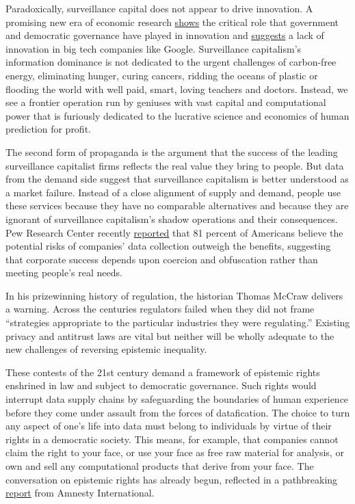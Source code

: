 Paradoxically, surveillance capital does not appear to drive innovation.
A promising new era of economic research
\href{https://www.youtube.com/watch?v=xJgjLfx-Bcs}{shows} the critical
role that government and democratic governance have played in innovation
and
\href{http://germangutierrezg.com/GutierrezPhilippon_Fading_Stars_2019.pdf}{suggests}
a lack of innovation in big tech companies like Google. Surveillance
capitalism's information dominance is not dedicated to the urgent
challenges of carbon-free energy, eliminating hunger, curing cancers,
ridding the oceans of plastic or flooding the world with well paid,
smart, loving teachers and doctors. Instead, we see a frontier operation
run by geniuses with vast capital and computational power that is
furiously dedicated to the lucrative science and economics of human
prediction for profit.

The second form of propaganda is the argument that the success of the
leading surveillance capitalist firms reflects the real value they bring
to people. But data from the demand side suggest that surveillance
capitalism is better understood as a market failure. Instead of a close
alignment of supply and demand, people use these services because they
have no comparable alternatives and because they are ignorant of
surveillance capitalism's shadow operations and their consequences. Pew
Research Center recently
\href{https://www.pewresearch.org/internet/2019/11/15/americans-and-privacy-concerned-confused-and-feeling-lack-of-control-over-their-personal-information/}{reported}
that 81 percent of Americans believe the potential risks of companies'
data collection outweigh the benefits, suggesting that corporate success
depends upon coercion and obfuscation rather than meeting people's real
needs.

In his prizewinning history of regulation, the historian Thomas McCraw
delivers a warning. Across the centuries regulators failed when they did
not frame ``strategies appropriate to the particular industries they
were regulating.'' Existing privacy and antitrust laws are vital but
neither will be wholly adequate to the new challenges of reversing
epistemic inequality.

These contests of the 21st century demand a framework of epistemic
rights enshrined in law and subject to democratic governance. Such
rights would interrupt data supply chains by safeguarding the boundaries
of human experience before they come under assault from the forces of
datafication. The choice to turn any aspect of one's life into data must
belong to individuals by virtue of their rights in a democratic society.
This means, for example, that companies cannot claim the right to your
face, or use your face as free raw material for analysis, or own and
sell any computational products that derive from your face. The
conversation on epistemic rights has already begun, reflected in a
pathbreaking
\href{https://amnestyusa.org/wp-content/uploads/2019/11/Surveillance-Giants-Embargo-21-Nov-0001-GMT-FINAL-report.pdf}{report}
from Amnesty International.

